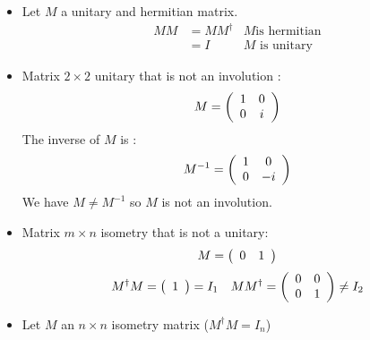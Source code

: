 \begin{itemize}
  \item Let $M$ a unitary and hermitian matrix.
    \begin{align*}
      M M &= M M^\dagger & M \text{is hermitian} \\
          &= I & M \text{ is unitary}
    \end{align*}
  \item Matrix $2\times 2$ unitary that is not an involution :
    \begin{align*}
      M = \left(
      \begin{array}{c c}
        1 & 0\\
        0 & i\\
      \end{array}
      \right)
    \end{align*}
    The inverse of $M$ is :
    \begin{align*}
      M^{-1} = \left(
      \begin{array}{c c}
        1 & 0\\
        0 & -i\\
      \end{array}
      \right)
    \end{align*}
    We have $M \not = M^{-1}$ so $M$ is not an involution.
  \item Matrix $m\times n$ isometry that is not a unitary:
    \begin{align*}
      M = \left(
      \begin{array}{c c}
        0 & 1\\
      \end{array}
      \right)
    \end{align*}
    \begin{align*}
      M^\dagger M =
      \left(\begin{array}{c}
        1\\
      \end{array}
      \right) = I_1
      \quad
      MM^\dagger =
      \left(\begin{array}{c c}
        0 & 0\\
        0 & 1
      \end{array}
      \right) \not = I_2
    \end{align*}
  \item Let $M$ an $n \times n$ isometry matrix ($M^\dagger M = I_n$)

\end{itemize}
